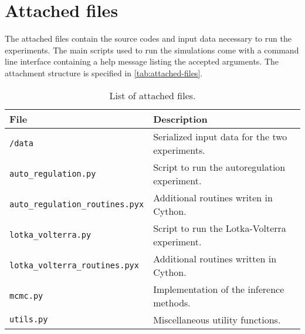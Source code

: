 \chapter{Attached files}
\label{chap:appendix}

The attached files contain the source codes and input data necessary to run the experiments. The main scripts used to run the simulations come with a command line interface containing a help message listing the accepted arguments. The attachment structure is specified in \autoref{tab:attached-files}.

\begin{table}[ht]
    \centering
    \begin{tabular}{ll}
        \hline
        \bf File & \bf Description \\ \hline
        \texttt{/data} & Serialized input data for the two experiments. \\
        \texttt{auto\_regulation.py} & Script to run the autoregulation experiment. \\
        \texttt{auto\_regulation\_routines.pyx} & Additional routines writen in Cython. \\
        \texttt{lotka\_volterra.py} & Script to run the Lotka-Volterra experiment. \\
        \texttt{lotka\_volterra\_routines.pyx} & Additional routines written in Cython. \\
        \texttt{mcmc.py} & Implementation of the inference methods. \\
        \texttt{utils.py} & Miscellaneous utility functions. \\
        \hline
    \end{tabular}
    \caption{List of attached files.}
    \label{tab:attached-files}
\end{table}